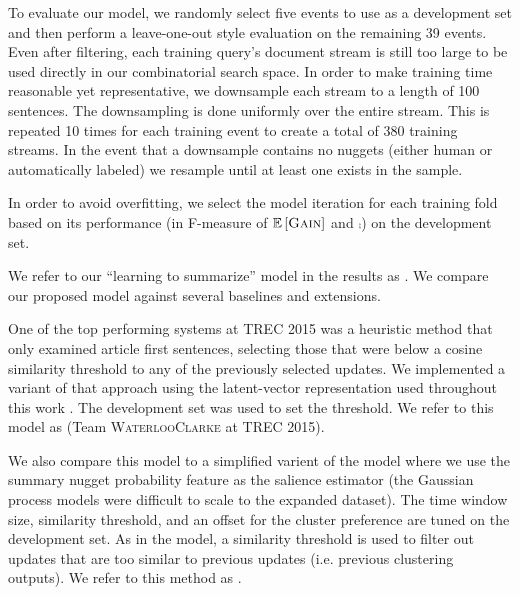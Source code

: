  To evaluate our model, we randomly select five events to use as a
 development set and then perform a leave-one-out style evaluation on the
 remaining 39 events.
 Even after filtering,  each training query's document stream is still too
 large to be used directly in our combinatorial search space. In order to
 make training time reasonable yet representative, we downsample each stream
 to a length of 100 sentences. The downsampling is done uniformly over the
 entire stream. This is repeated 10 times for each training event to create a
 total of 380 training streams. In the event that a downsample contains no
 nuggets (either human or automatically labeled) we resample until at least
 one exists in the sample. 

 In order to avoid overfitting, we select the model iteration for each
 training fold based on its performance (in F-measure of $\mathbb{E}\left[\textsc{Gain}\right]$ and
 $\comp$) on the development set.


 We refer to our ``learning to summarize'' model in the results as 
 \modelLS.
 We compare our proposed model against several baselines and extensions. 

 One of the top performing systems 
 at TREC 2015 was a heuristic method that only
 examined article first sentences, selecting those that were below a cosine
 similarity threshold to any of the previously selected updates. We
 implemented a variant of that approach using the latent-vector
 representation used throughout this work \citep{guo2012simple}. 
 The development set was used to
 set the threshold. We refer to this model as \modelCos{} (Team
 \textsc{WaterlooClarke} at TREC 2015).
  
 We also compare this model to a simplified varient of the \sap{} model
where we use the summary
nugget probability feature as the salience estimator (the Gaussian process
models were difficult to scale to the expanded dataset).  The time
 window size, similarity threshold, and an offset for the cluster preference
 are tuned on the development set.
 As in the \modelCos{} model, a
 similarity threshold is used to filter out updates that are too similar to
 previous updates (i.e. previous clustering outputs).    
 We refer to this method as \sap.  


